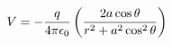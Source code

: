 \documentclass[preview]{standalone}
\begin{document}
\begin{align*}
V  =  - {q  \over 4\pi\epsilon_0}  \left(  {2a\cos\theta  \over  r^2 + a^2\cos^2\theta}  \right)
\end{align*}
\end{document}
